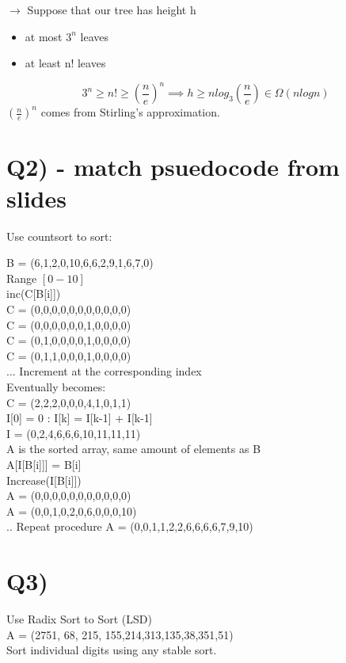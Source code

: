 \documentclass[12pt]{article}
\begin{document}
	$\rightarrow$ Suppose that our tree has height h\\
	\begin{itemize}
		\item at most $3^n$ leaves
		\item at least n! leaves
	\end{itemize}
	$$3^n \geq n! \geq (\frac{n}{e})^n \implies h \geq nlog_3(\frac{n}{e}) \in \Omega(nlogn)$$
	$(\frac{n}{e})^n$ comes from Stirling's approximation.\\
	
	\section*{Q2) - match psuedocode from slides}
	Use countsort to sort:
	
	B = (6,1,2,0,10,6,6,2,9,1,6,7,0)\\
	Range $[0-10]$\\
	
	inc(C[B[i]])\\
	
	C = (0,0,0,0,0,0,0,0,0,0,0)\\
	
	C = (0,0,0,0,0,0,1,0,0,0,0)\\
	C = (0,1,0,0,0,0,1,0,0,0,0)\\
	C = (0,1,1,0,0,0,1,0,0,0,0)\\
	... Increment at the corresponding index\\
	Eventually becomes:\\
	C = (2,2,2,0,0,0,4,1,0,1,1)\\
	
	I[0] = 0 : I[k] = I[k-1] + I[k-1]\\
	
	I = (0,2,4,6,6,6,10,11,11,11)\\
	
	A is the sorted array, same amount of elements as B\\
	
	A[I[B[i]]] = B[i]\\
	Increase(I[B[i]])\\
	
	A = (0,0,0,0,0,0,0,0,0,0,0)\\
	A = (0,0,1,0,2,0,6,0,0,0,10)\\
	.. Repeat procedure
	A = (0,0,1,1,2,2,6,6,6,6,7,9,10)\\
	
	\section*{Q3)}
	Use Radix Sort to Sort (LSD)\\
	A = (2751, 68, 215, 155,214,313,135,38,351,51)\\
	Sort individual digits using any stable sort.\\
	
\end{document}
